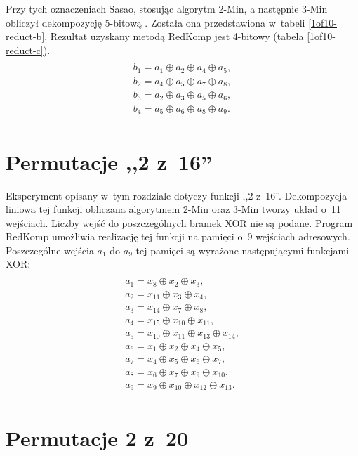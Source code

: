 Przy tych oznaczeniach Sasao,
stosując algorytm 2-Min,
a następnie 3-Min obliczył dekompozycję 5-bitową \cite{sasao-s-min}.
Została ona przedstawiona w~tabeli \ref{1of10-reduct-b}.
Rezultat uzyskany metodą RedKomp jest 4-bitowy (tabela \ref{1of10-reduct-c}).
\begin{multline} \\
b_1 = a_1 \oplus a_2 \oplus a_4 \oplus a_5, \\
b_2 = a_4 \oplus a_5 \oplus a_7 \oplus a_8, \\
b_3 = a_2 \oplus a_3 \oplus a_5 \oplus a_6, \\
b_4 = a_5 \oplus a_6 \oplus a_8 \oplus a_9. \\
\end{multline}




\section{Permutacje ,,2 z~16''}

Eksperyment opisany w~tym rozdziale dotyczy funkcji ,,2 z~16''.
Dekompozycja liniowa tej funkcji obliczana algorytmem 2-Min oraz 3-Min \cite{sasao-s-min} tworzy układ o~11 wejściach.
Liczby wejść do poszczególnych bramek XOR nie są podane.
Program RedKomp umożliwia realizację tej funkcji na pamięci o~9 wejściach adresowych.
Poszczególne wejścia $a_1$ do $a_9$ tej pamięci są wyrażone następującymi funkcjami XOR:
\begin{multline} \\
a_1 = x_8 \oplus x_2 \oplus x_3, \\
a_2 = x_{11} \oplus x_3 \oplus x_4, \\
a_3 = x_{14} \oplus x_7 \oplus x_8, \\
a_4 = x_{15} \oplus x_{10} \oplus x_{11}, \\
a_5 = x_{10} \oplus x_{11} \oplus x_{13} \oplus x_{14}, \\
a_6 = x_1 \oplus x_2 \oplus x_4 \oplus x_5, \\
a_7 = x_4 \oplus x_5 \oplus x_6 \oplus x_7, \\
a_8 = x_6 \oplus x_7 \oplus x_9 \oplus x_{10}, \\
a_9 = x_9 \oplus x_{10} \oplus x_{12} \oplus x_{13}. \\
\end{multline}

\section{Permutacje 2 z~20}

